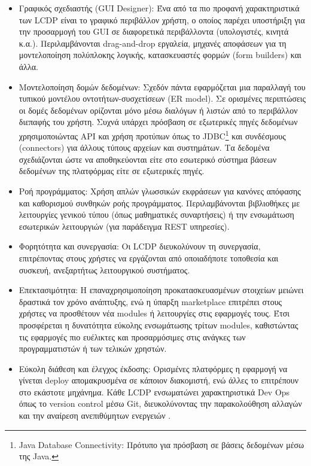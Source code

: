             \begin{itemize}[label={\tiny \blacksquare}]
                \setlength\itemsep{-0.25em}
                \item Γραφικός σχεδιαστής (GUI Designer): Ένα από τα πιο προφανή χαρακτηριστικά των LCDP είναι το γραφικό περιβάλλον χρήστη, ο οποίος παρέχει υποστήριξη για την προσαρμογή του GUI σε διαφορετικά περιβάλλοντα (υπολογιστές, κινητά κ.α.). Περιλαμβάνονται drag-and-drop εργαλεία, μηχανές αποφάσεων για τη μοντελοποίηση πολύπλοκης λογικής, κατασκευαστές φορμών (form builders) και άλλα.
                \item Μοντελοποίηση δομών δεδομένων: Σχεδόν πάντα εφαρμόζεται μια παραλλαγή του τυπικού μοντέλου οντοτήτων-συσχετίσεων (ER model). Σε ορισμένες περιπτώσεις οι δομές δεδομένων ορίζονται μόνο μέσω διαλόγων ή λιστών από το περιβάλλον διεπαφής του χρήστη. Συχνά υπάρχει πρόσβαση σε εξωτερικές πηγές δεδομένων χρησιμοποιώντας API και χρήση προτύπων όπως το JDBC\footnote{Java Database Connectivity: Πρότυπο για πρόσβαση σε βάσεις δεδομένων μέσω της Java.} και συνδέσμους (connectors) για άλλους τύπους αρχείων και συστημάτων. Τα δεδομένα σχεδιάζονται ώστε να αποθηκεύονται είτε στο εσωτερικό σύστημα βάσεων δεδομένων της πλατφόρμας είτε σε εξωτερικές πηγές.
                \item Ροή προγράμματος: Χρήση απλών γλωσσικών εκφράσεων για κανόνες απόφασης και καθορισμού συνθηκών ροής προγράμματος. Περιλαμβάνονται βιβλιοθήκες με λειτουργίες γενικού τύπου (όπως μαθηματικές συναρτήσεις) ή την ενσωμάτωση εσωτερικών λειτουργιών (για παράδειγμα REST υπηρεσίες).
                \item Φορητότητα και συνεργασία: Οι LCDP διευκολύνουν τη συνεργασία, επιτρέποντας στους χρήστες να εργάζονται από οποιαδήποτε τοποθεσία και συσκευή, ανεξαρτήτως λειτουργικού συστήματος.
                \item Επεκτασιμότητα: Η επαναχρησιμοποίηση προκατασκευασμένων στοιχείων μειώνει δραστικά τον χρόνο ανάπτυξης, ενώ η ύπαρξη marketplace επιτρέπει στους χρήστες να προσθέτουν νέα modules ή λειτουργίες στις εφαρμογές τους. Έτσι προσφέρεται η δυνατότητα εύκολης ενσωμάτωσης τρίτων modules, καθιστώντας τις εφαρμογές πιο ευέλικτες και προσαρμόσιμες στις ανάγκες των προγραμματιστών ή των τελικών χρηστών.
                \item Εύκολη διάθεση και έλεγχος έκδοσης: Ορισμένες πλατφόρμες η εφαρμογή να γίνεται deploy απομακρυσμένα σε κάποιον διακομιστή, ενώ άλλες το επιτρέπουν στο εκάστοτε μηχάνημα. Κάθε LCDP ενσωματώνει χαρακτηριστικά Dev Ops όπως το version control μέσω Git, διευκολύνοντας την παρακολούθηση αλλαγών και την αναίρεση ανεπιθύμητων ενεργειών \cite{Bock2021}.
            \end{itemize}

